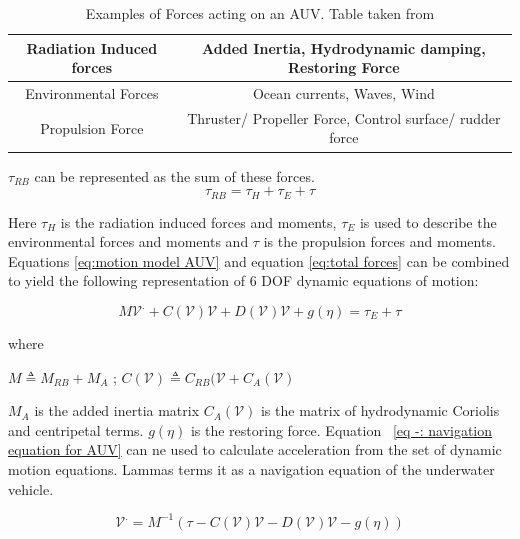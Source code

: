 \documentclass[12pt]{dalcsthesis}
\begin{document}
\begin{table}[tbh]
\centering
\begin{tabular}{|c|c|}
\hline 
Radiation Induced forces & Added Inertia, Hydrodynamic damping, Restoring Force \\ 
\hline 
Environmental Forces & Ocean currents, Waves, Wind \\ 
\hline 
Propulsion Force & Thruster/ Propeller Force, Control surface/ rudder force \\ 
\hline 
\end{tabular} 
\caption{\label{forces auv examples}Examples of Forces acting on an AUV. Table taken from \cite{Thor}}
\end{table}


$\tau_{RB}$ can be represented as the sum of these forces.
\begin{equation}
\label{eq:total forces}
 \tau_{RB} = \tau_{H} + \tau_{E} + \tau 
\end{equation}

Here $\tau_{H}$ is the radiation induced forces and moments, $\tau_{E}$ is used to describe the environmental forces and moments and $\tau$ is the propulsion forces and moments. Equations \ref{eq:motion model AUV} and equation \ref{eq:total forces} can be combined to yield the following representation of 6 DOF dynamic equations of motion:
 

\begin{equation}
\label{eq:vehicle hydrodynamics}
M\mathcal{{V}}^{.}+C(\mathcal{V})\mathcal{V}+D(\mathcal{V})\mathcal{V}+g(\eta)=\tau_{E}+\tau%
\end{equation}

where 

$M \triangleq M_{RB} + M_{A}$ ; $C(\mathcal{V}) \triangleq C_{RB}(\mathcal{V} + C_{A}(\mathcal{V})$

$M_A$ is the added inertia  matrix $C_{A}(\mathcal{V})$ is the matrix of hydrodynamic Coriolis and centripetal terms. $g(\eta)$ is the restoring force.
Equation ~\ref{eq -: navigation equation for AUV} can ne used to calculate acceleration from the set of dynamic motion equations. Lammas \cite{Lammas2004} terms it as a navigation equation of the underwater vehicle.   


\begin{equation}
\label{eq-: navigation equation for AUV}
\mathcal{V}^{.} = M^{-1}(\tau-C(\mathcal{V})\mathcal{V}-D(\mathcal{V})\mathcal{V}-g(\eta))
\end{equation}
\end{document}
